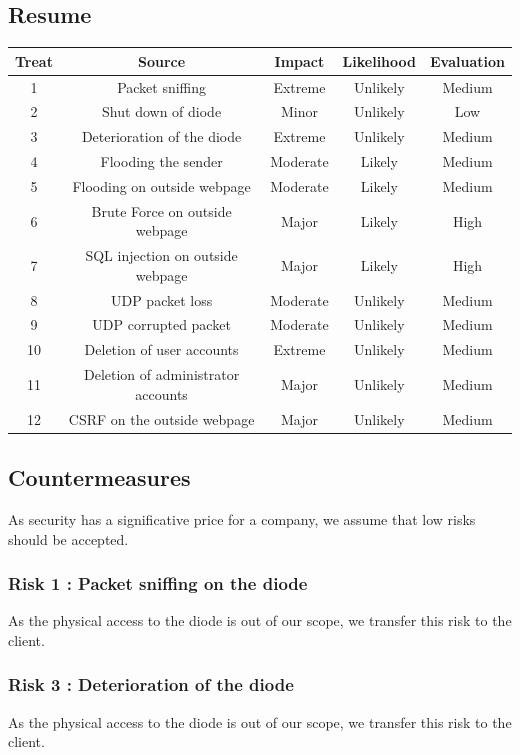 \documentclass[a4paper,11pt]{article}
\begin{document}
\subsection{Resume}
\begin{tabular}{|c|c|c|c|c|}
\hline
Treat & Source & Impact& Likelihood & Evaluation \\
\hline
1 &  Packet sniffing & Extreme  & Unlikely & Medium\\
\hline
2 & Shut down of diode & Minor & Unlikely & Low \\
\hline
3 & Deterioration of the diode & Extreme & Unlikely & Medium\\
\hline
4 & Flooding the sender & Moderate & Likely & Medium\\
\hline
5 & Flooding on outside webpage & Moderate & Likely & Medium \\
\hline 
6 &  Brute Force on outside webpage & Major & Likely & High\\
\hline
7 & SQL injection on outside webpage & Major & Likely & High \\
\hline
8 & UDP packet loss & Moderate & Unlikely & Medium \\
\hline
9 & UDP corrupted packet & Moderate & Unlikely & Medium \\
\hline
10 & Deletion of user accounts & Extreme & Unlikely & Medium \\
\hline
11 & Deletion of administrator accounts & Major & Unlikely & Medium \\
\hline
12 & CSRF on the outside webpage & Major & Unlikely & Medium \\
\hline

  
\end{tabular}
\subsection{Countermeasures}
As security has a significative price for a company, we assume that low risks should be accepted.
\subsubsection{Risk 1 : Packet sniffing on the diode}
As the physical access to the diode is out of our scope, we transfer this risk to the client.
\subsubsection{Risk 3 : Deterioration of the diode}
As the physical access to the diode is out of our scope, we transfer this risk to the client.
\end{document}

